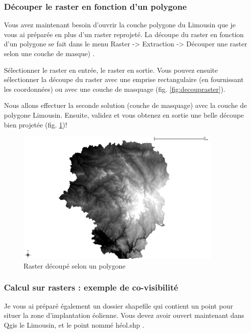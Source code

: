 \documentclass[a4paper, 11pt]{article}
\begin{document}
    \subsubsection{Découper le raster en fonction d’un polygone}

    Vous avez maintenant besoin d'ouvrir la couche polygone du Limousin que je vous ai préparée en plus d'un raster reprojeté. La découpe du raster en fonction d'un polygone se fait dans le menu Raster -> Extraction -> Découper une raster selon une couche de masque) .

    Sélectionner le raster en entrée, le raster en sortie. Vous pouvez ensuite sélectionner la découpe du raster avec une emprise rectangulaire (en fournissant les coordonnées) ou avec une couche de masquage (fig. \ref{fig:decoupraster}).

    Nous allons effectuer la seconde solution (couche de masquage) avec la couche de polygone Limousin. Ensuite, validez et vous obtenez en sortie une belle découpe bien projetée (fig. \ref{fig:carte_limousin_decoup})!

    \begin{figure}
    \centering
    \includegraphics[width=0.9\textwidth]{img/rasterLimousin}
      \caption{Raster découpé selon un polygone}\label{fig:carte_limousin_decoup}
    \end{figure}

    \subsubsection{Calcul sur rasters : exemple de co-visibilité}

    Je vous ai préparé également un dossier shapefile qui contient un point pour situer la zone d'implantation éolienne. Vous devez avoir ouvert maintenant dans Qgis le Limousin, et le point nommé héol.shp .
\end{document}
